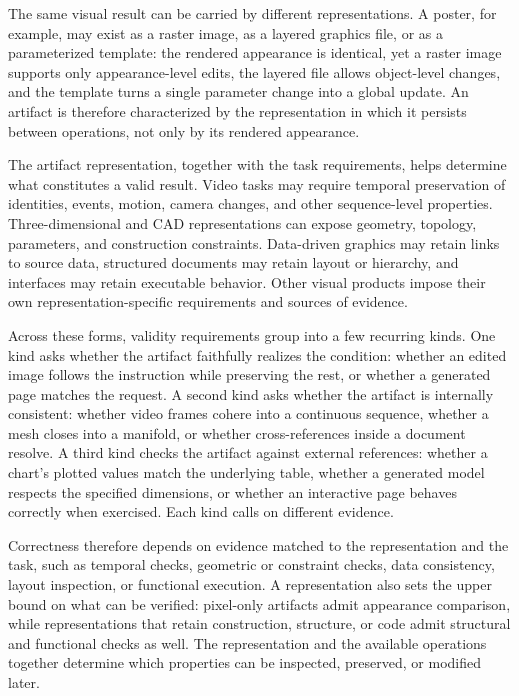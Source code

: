 The same visual result can be carried by different representations. A poster, for example, may exist as a raster image, as a layered graphics file, or as a parameterized template: the rendered appearance is identical, yet a raster image supports only appearance-level edits, the layered file allows object-level changes, and the template turns a single parameter change into a global update. An artifact is therefore characterized by the representation in which it persists between operations, not only by its rendered appearance.

The artifact representation, together with the task requirements, helps determine what constitutes a valid result. Video tasks may require temporal preservation of identities, events, motion, camera changes, and other sequence-level properties. Three-dimensional and CAD representations can expose geometry, topology, parameters, and construction constraints. Data-driven graphics may retain links to source data, structured documents may retain layout or hierarchy, and interfaces may retain executable behavior. Other visual products impose their own representation-specific requirements and sources of evidence.

Across these forms, validity requirements group into a few recurring kinds. One kind asks whether the artifact faithfully realizes the condition: whether an edited image follows the instruction while preserving the rest, or whether a generated page matches the request. A second kind asks whether the artifact is internally consistent: whether video frames cohere into a continuous sequence, whether a mesh closes into a manifold, or whether cross-references inside a document resolve. A third kind checks the artifact against external references: whether a chart's plotted values match the underlying table, whether a generated model respects the specified dimensions, or whether an interactive page behaves correctly when exercised. Each kind calls on different evidence.

Correctness therefore depends on evidence matched to the representation and the task, such as temporal checks, geometric or constraint checks, data consistency, layout inspection, or functional execution. A representation also sets the upper bound on what can be verified: pixel-only artifacts admit appearance comparison, while representations that retain construction, structure, or code admit structural and functional checks as well. The representation and the available operations together determine which properties can be inspected, preserved, or modified later.

